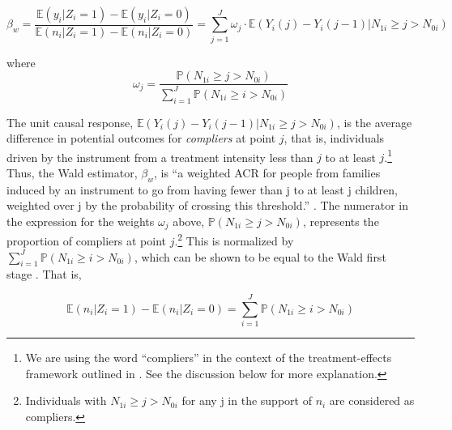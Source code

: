 \begin{equation}\label{eq:02}
	\beta_{w} = \dfrac{\mathbb{E}(y_{i} | Z_{i} = 1) - \mathbb{E}(y_{i} | Z_{i} = 0)}{\mathbb{E}(n_{i} | Z_{i} = 1) - \mathbb{E}(n_{i} | Z_{i} = 0)} = \sum_{j = 1}^{J} \omega_{j}\cdot \mathbb{E}(Y_{i}(j) - Y_{i}(j-1) | N_{1i} \geq j > N_{0i})
\end{equation}

where
\begin{equation}\label{eq:03}
\omega_{j} = \dfrac{\mathbb{P}(N_{1i} \geq j > N_{0i})}{\sum_{i = 1}^{J} \mathbb{P}(N_{1i} \geq i > N_{0i})}
\end{equation}
\vskip10pt

The unit causal response, $ \mathbb{E}(Y_{i}(j) - Y_{i}(j-1) | N_{1i} \geq j > N_{0i}) $, is the average difference in potential outcomes for \textit{compliers} at point $ j $, that is, individuals driven by the instrument from a treatment intensity less than $ j $ to at least $ j $.\footnote{We are using the word \enquote{compliers} in the context of the treatment-effects framework outlined in \textcite{angrist_identification_1996}. See the discussion below for more explanation.} Thus, the Wald estimator, $ \beta_{w} $, is \enquote{a weighted ACR for people from families induced by an instrument to go from having fewer than j to at least j children, weighted over j by the probability of crossing this threshold.} \parencite[p.~787]{angrist_multiple_2010}. The numerator in the expression for the weights $ \omega_{j} $ above, $ \mathbb{P}(N_{1i} \geq j > N_{0i}) $, represents the proportion of compliers at point $ j $.\footnote{Individuals with $ N_{1i} \geq j > N_{0i} $  for any j in the support of $ n_{i} $ are considered as compliers.} This is normalized by $ \sum_{i = 1}^{J} \mathbb{P}(N_{1i} \geq i > N_{0i}) $, which can be shown to be equal to the Wald first stage \parencite[see][p.~183]{Angrist2009}. That is,

\begin{equation}\label{eq:04}
\mathbb{E}(n_{i} | Z_{i} = 1) - \mathbb{E}(n_{i} | Z_{i} = 0) = \sum_{i = 1}^{J} \mathbb{P}(N_{1i} \geq i > N_{0i})
\end{equation}

